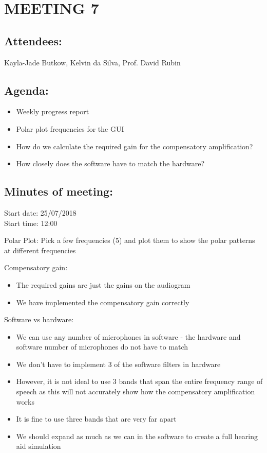 \documentclass[10pt,onecolumn]{witseiepaper}
\begin{document}
\section*{MEETING 7}
\subsection*{Attendees:}
Kayla-Jade Butkow, Kelvin da Silva, Prof. David Rubin
\subsection*{Agenda:} 
\begin{itemize}
	\item Weekly progress report
	\item Polar plot frequencies for the GUI
	\item How do we calculate the required gain for the compensatory amplification?
	\item How closely does the software have to match the hardware?
\end{itemize}

\subsection*{Minutes of meeting:}
Start date: 25/07/2018 \\
Start time: 12:00

Polar Plot:
Pick a few frequencies (5) and plot them to show the polar patterns at different frequencies

Compensatory gain:
\begin{itemize}
	\item The required gains are just the gains on the audiogram
	\item We have implemented the compensatory gain correctly
\end{itemize}

Software vs hardware:
\begin{itemize}
	\item We can use any number of microphones in software - the hardware and software number of microphones do not have to match
	\item We don't have to implement 3 of the software filters in hardware
	\item However, it is not ideal to use 3 bands that span the entire frequency range of speech as this will not accurately show how the compensatory amplification works
	\item It is fine to use three bands that are very far apart
	\item We should expand as much as we can in the software to create a full hearing aid simulation
\end{itemize}
\end{document}
